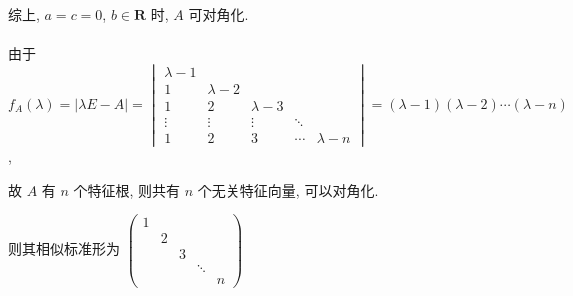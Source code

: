          综上, \( a = c = 0 \), \( b \in \mathbf{R} \) 时, \( A \) 可对角化.


     \paragraph{} %
         由于 \( f_{A}(\lambda) = |\lambda E - A| = \begin{vmatrix}
             \lambda-1 &           &           &                    \\
             1         & \lambda-2 &           &                    \\
             1         & 2         & \lambda-3 &                    \\
             \vdots    & \vdots    & \vdots    & \ddots             \\
             1         & 2         & 3         & \cdots & \lambda-n
         \end{vmatrix} = (\lambda - 1)(\lambda - 2)\cdots(\lambda - n) \),

         故 \( A \) 有 \( n \) 个特征根, 则共有 \( n \) 个无关特征向量, 可以对角化.

         则其相似标准形为 \( \begin{pmatrix}
             1 &   &   &            \\
               & 2 &   &            \\
               &   & 3 &            \\
               &   &   & \ddots     \\
               &   &   &        & n
         \end{pmatrix} \)


 \subsection{} %
